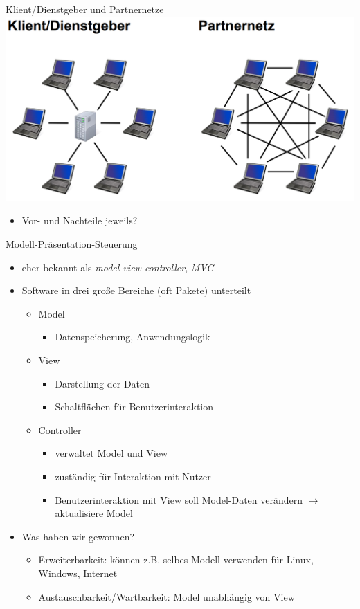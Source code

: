 \documentclass[18pt]{beamer}
\begin{document}
\begin{frame}{Klient/Dienstgeber und Partnernetze}
	\centering \includegraphics[scale=0.3]{pics/tut3/client-server-peer.png}
	\begin{itemize}
		\item Vor- und Nachteile jeweils?
	\end{itemize}
\end{frame}

\begin{frame}{Modell-Präsentation-Steuerung}
	\begin{itemize}
		\item eher bekannt als \emph{model-view-controller}, \emph{MVC}
		\item Software in drei große Bereiche (oft Pakete) unterteilt
		\begin{itemize}
			\item Model
			\begin{itemize}
				\item Datenspeicherung, Anwendungslogik
			\end{itemize}
			\item View
			\begin{itemize}
				\item Darstellung der Daten
				\item Schaltflächen für Benutzerinteraktion
			\end{itemize}
			\item Controller
			\begin{itemize}
				\item verwaltet Model und View
				\item zuständig für Interaktion mit Nutzer
				\item Benutzerinteraktion mit View soll Model-Daten verändern \newline $\rightarrow$ aktualisiere Model
			\end{itemize}
		\end{itemize}
	\pause
		\item Was haben wir gewonnen?
		\begin{itemize}
			\item Erweiterbarkeit: können z.B. selbes Modell verwenden für Linux, Windows, Internet
			\item Austauschbarkeit/Wartbarkeit: Model unabhängig von View
		\end{itemize}
	\end{itemize}
\end{frame}
\end{document}
